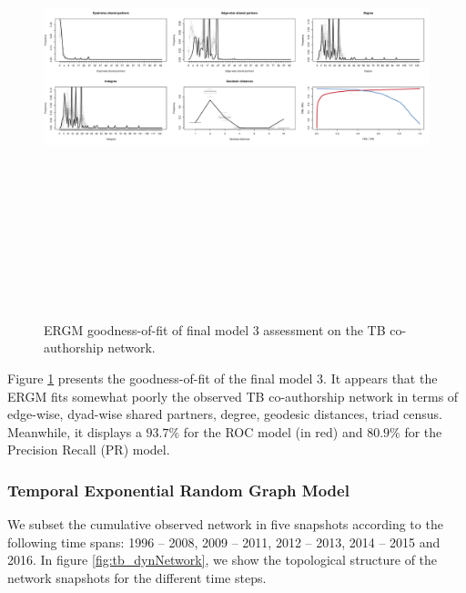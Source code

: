 \begin{figure}
\centering
\hspace*{-1cm}
\includegraphics[height=14cm,width=22cm]{Chapters/tb/statMod/tb_ergm_gof2}
\caption{ERGM goodness-of-fit of final model 3 assessment on the TB co-authorship network.%
}
\label{fig:tb_ergm-gof}
\end{figure}

Figure \ref{fig:tb_ergm-gof} presents the goodness-of-fit of the final model 3. It appears that the ERGM fits somewhat poorly the observed TB co-authorship network in terms of edge-wise, dyad-wise shared partners, degree, geodesic distances, triad census. Meanwhile, it displays a $93.7\%$ for the ROC model (in red) and $80.9\%$ for the Precision Recall (PR) model.

\subsubsection{Temporal Exponential Random Graph Model}
\label{sec:tb_results_tergm}
We subset the cumulative observed network in five snapshots according to the following time spans: 1996 -- 2008, 2009 -- 2011, 2012 -- 2013, 2014 -- 2015 and 2016. In figure \ref{fig:tb_dynNetwork}, we show the topological structure of the network snapshots for the different time steps.

